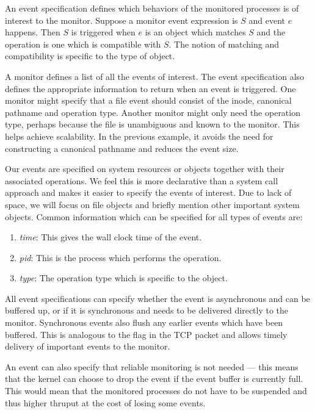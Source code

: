 An event specification defines which behaviors
of the monitored processes is of interest to the monitor.
Suppose a monitor event expression is $S$
and event $e$ happens. Then $S$ is triggered when $e$ is an object 
which matches $S$ and the operation is one which is compatible with $S$.
The notion of matching and compatibility is specific to the type of object.

A monitor defines a list of all the events of interest.
The event specification also defines the appropriate
information to return when an event is triggered.
One monitor might specify that a file event should 
consist of the inode, canonical pathname and operation type.
Another monitor might only need the operation type, perhaps because
the file is unambiguous and known to the monitor.
This helps achieve scalability. In the previous example,
it avoids the need for constructing a canonical
pathname and reduces the event size.

Our events are specified on system resources or objects together with their
associated operations. 
We feel this is more declarative than a system call approach
and makes it easier to specify the events of interest.
Due to lack of space, we will focus on file objects and briefly mention
other important system objects.
Common information which can be specified
for all types of events are:
\begin{enumerate}
\item {\em time}:
This gives the wall clock time of the event.
\item {\em pid}:
This is the process which performs the operation.
\item {\em type}:
The operation type which is specific to the object.
\end{enumerate}

All event specifications can 
specify whether the event is asynchronous and can be buffered up,
or if it is synchronous and needs to be delivered directly to the monitor.
Synchronous events also flush any earlier events which have been buffered.
This is analogous to the  flag in the TCP packet
and allows timely delivery of important events to the monitor.

An event can also specify that reliable monitoring is not needed ---
this means that the kernel can choose to drop the event if the 
event buffer is currently full.
This would mean that the monitored processes do not have to be suspended
and thus higher thruput at the cost of losing some events.

